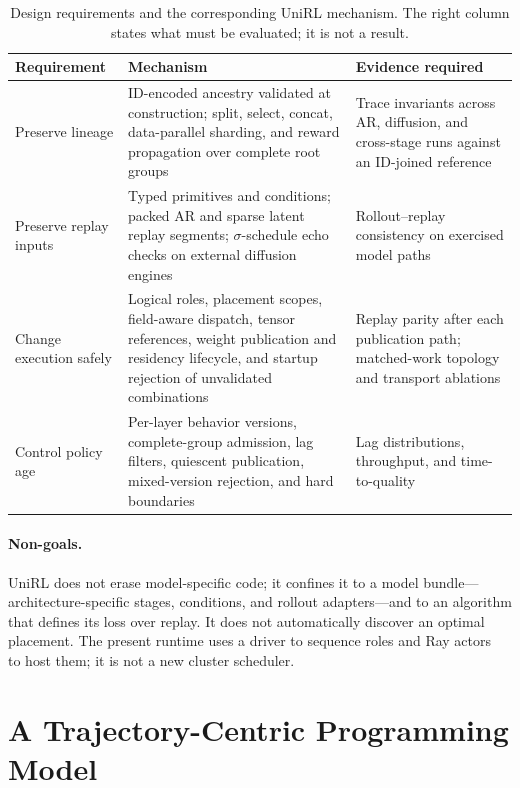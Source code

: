 \documentclass[10pt]{article}
\begin{document}
\begin{table}[H]
\caption{Design requirements and the corresponding UniRL mechanism. The right column states what must be evaluated; it is not a result.}
\label{tab:requirements}
\centering
\small
\begin{tabularx}{\textwidth}{@{}L{0.17\textwidth}Y Y@{}}
\toprule
Requirement & Mechanism & Evidence required \\
\midrule
Preserve lineage & ID-encoded ancestry validated at construction; split, select, concat, data-parallel sharding, and reward propagation over complete root groups & Trace invariants across AR, diffusion, and cross-stage runs against an ID-joined reference \\
Preserve replay inputs & Typed primitives and conditions; packed AR and sparse latent replay segments; $\sigma$-schedule echo checks on external diffusion engines & Rollout--replay consistency on exercised model paths \\
Change execution safely & Logical roles, placement scopes, field-aware dispatch, tensor references, weight publication and residency lifecycle, and startup rejection of unvalidated combinations & Replay parity after each publication path; matched-work topology and transport ablations \\
Control policy age & Per-layer behavior versions, complete-group admission, lag filters, quiescent publication, mixed-version rejection, and hard boundaries & Lag distributions, throughput, and time-to-quality \\
\bottomrule
\end{tabularx}
\end{table}

\paragraph{Non-goals.}
UniRL does not erase model-specific code; it confines it to a model bundle---architecture-specific stages, conditions, and rollout adapters---and to an algorithm that defines its loss over replay.
It does not automatically discover an optimal placement.
The present runtime uses a driver to sequence roles and Ray actors~\citep{moritz2018ray} to host them; it is not a new cluster scheduler.

\section{A Trajectory-Centric Programming Model}
\label{sec:trajectory}
\end{document}

